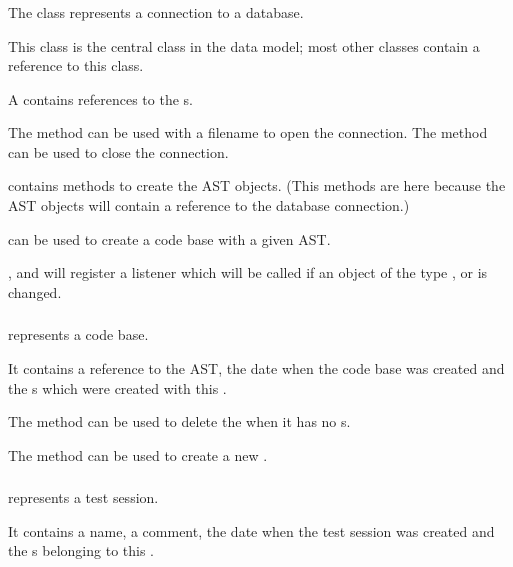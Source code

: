 \subsubsection{}

The class  represents a connection to a database.

This class is the central class in the data model; most other classes contain
a reference to this class.

A  contains references to the s.

The method  can be used with a filename to open the
connection.
The method  can be used to close the connection.

 contains methods to create the AST objects.
(This methods are here
because the AST objects will contain a reference to the database connection.)

 can be used to create a code base with a given AST.

,  and
 will register a listener which will be called
if an object of the type ,  or 
is changed.

\subsubsection{}

 represents a code base.

It contains a reference to the AST, the date when the code base was created
and the s which were created with this .

The method  can be used to delete the  when
it has no s.

The method  can be used to create a new
.

\subsubsection{}

 represents a test session.

It contains a name, a comment, the date when the test session was created and
the s belonging to this .

